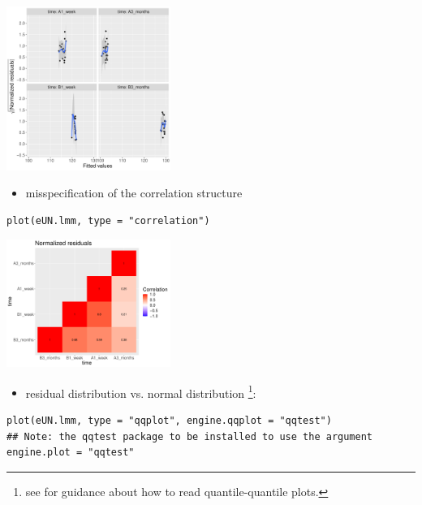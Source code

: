 \documentclass[12pt]{article}
\begin{document}
\begin{center}
\includegraphics[width=0.4\textwidth]{./figures/diag-scatterplot2.pdf}
\end{center}

\clearpage

\begin{itemize}
\item misspecification of the correlation structure
\end{itemize}
\lstset{language=r,label= ,caption= ,captionpos=b,numbers=none}
\begin{lstlisting}
plot(eUN.lmm, type = "correlation")
\end{lstlisting}

\begin{center}
\includegraphics[width=0.4\textwidth]{./figures/diag-correlation.pdf}
\end{center}

\begin{itemize}
\item residual distribution vs. normal distribution \footnote{see \cite{oldford2016self} for guidance
about how to read quantile-quantile plots.}:
\end{itemize}
\lstset{language=r,label= ,caption= ,captionpos=b,numbers=none}
\begin{lstlisting}
plot(eUN.lmm, type = "qqplot", engine.qqplot = "qqtest")
## Note: the qqtest package to be installed to use the argument engine.plot = "qqtest" 
\end{lstlisting}
\end{document}
